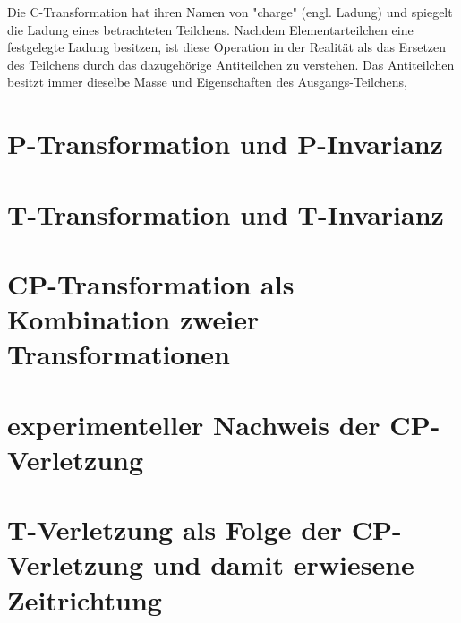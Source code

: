 \documentclass[12pt,a4paper]{scrartcl}
\numberwithin{equation}{section}
\begin{document}
Die C-Transformation hat ihren Namen von "charge" (engl. Ladung) und spiegelt die Ladung eines betrachteten Teilchens. Nachdem Elementarteilchen eine festgelegte Ladung besitzen, ist diese Operation in der Realität als das Ersetzen des Teilchens durch das dazugehörige Antiteilchen zu verstehen. Das Antiteilchen besitzt immer dieselbe Masse und Eigenschaften des Ausgangs-Teilchens,

  \newpage  %

  \section{P-Transformation und P-Invarianz}

  \newpage  %

  \section{T-Transformation und T-Invarianz}

  \newpage  %

  \section{CP-Transformation als Kombination zweier Transformationen}

  \newpage  %

  \section{experimenteller Nachweis der CP-Verletzung}

  \newpage  %

  \section{T-Verletzung als Folge der CP-Verletzung und damit erwiesene Zeitrichtung}
\end{document}
